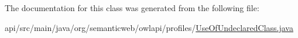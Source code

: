 The documentation for this class was generated from the following file\-:\begin{DoxyCompactItemize}
\item 
api/src/main/java/org/semanticweb/owlapi/profiles/\hyperlink{_use_of_undeclared_class_8java}{Use\-Of\-Undeclared\-Class.\-java}\end{DoxyCompactItemize}
